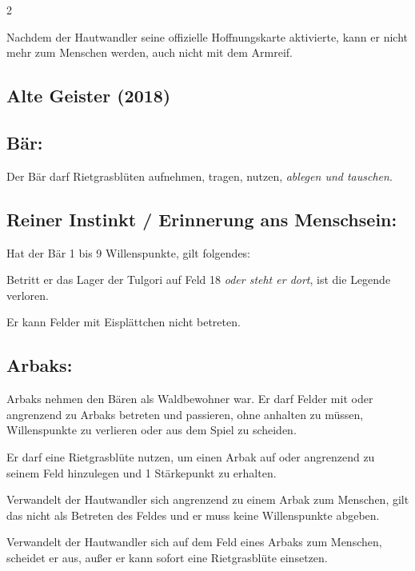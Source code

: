 \documentclass[10pt, a4paper, oneside]{book}
\newcommand{\fan}[1]{\textit{#1}}
\begin{document}
\begin{multicols*}{2}
\begin{bgcolor}
Nachdem der Hautwandler seine offizielle Hoffnungskarte aktivierte, kann er nicht mehr zum Menschen werden, auch nicht mit dem Armreif.
\supercite{92358}

\end{bgcolor}



\columnbreak




\begin{bgcolor}[color-ag]
\section{Alte Geister (2018)}

\subsection{Bär:}

Der Bär darf Rietgrasblüten aufnehmen, tragen, nutzen, \fan{ablegen und tauschen}. 
\supercite{ag-begleitheft}


\subsection{Reiner Instinkt / Erinnerung ans Menschsein:}

Hat der Bär 1 bis 9 Willenspunkte, gilt folgendes:

\bullet{} Betritt er das Lager der Tulgori auf Feld 18 \fan{oder steht er dort}, ist die Legende verloren.
\supercite{ag-begleitheft}

\bullet{} Er kann Felder mit Eisplättchen nicht betreten.
\supercite{ag-begleitheft}


\subsection{Arbaks:}

Arbaks nehmen den Bären als Waldbewohner war. Er darf Felder mit oder angrenzend zu Arbaks betreten und passieren, ohne anhalten zu müssen, Willenspunkte zu verlieren oder aus dem Spiel zu scheiden. 

Er darf eine Rietgrasblüte nutzen, um einen Arbak auf oder angrenzend zu seinem Feld hinzulegen und 1 Stärkepunkt zu erhalten.

Verwandelt der Hautwandler sich angrenzend zu einem Arbak zum Menschen, gilt das nicht als Betreten des Feldes und er muss keine Willenspunkte abgeben.

Verwandelt der Hautwandler sich auf dem Feld eines Arbaks zum Menschen, scheidet er aus, außer er kann sofort eine Rietgrasblüte einsetzen.
\supercite{ag-begleitheft}


\end{bgcolor}
\end{multicols*}
\end{document}
